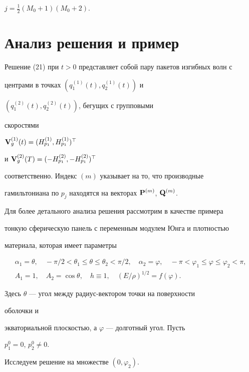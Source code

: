 $j=\frac{1}{2}(M_0+1)(M_0+2)$. 


 


\section{Анализ решения и пример} 


 


Решение (21) при $t>0$ представляет собой пару пакетов изгибных волн с 


центрами в точках $(q^{(1)}_1(t),q^{(1)}_2(t))$ и 


$(q^{(2)}_1(t),q^{(2)}_2(t))$, бегущих с групповыми 


скоростями 


$\bold V^{(1)}_g(t)=(H^{(1)}_{p_1},H^{(1)}_{p_1})^\top$ 


и $\bold V^{(2)}_g(T)=(-H^{(2)}_{p_1},-H^{(2)}_{p_1})^\top$ 


соответственно. Индекс $(m)$ указывает на то, что производные 


гамильтониана по $p_j$ находятся на векторах $\bold P^{(m)}$, $\bold Q^{(m)}$. 


 


Для более детального анализа решения рассмотрим в качестве примера 


тонкую сферическую панель с переменным модулем Юнга и плотностью 


материала, которая имеет параметры


\begin{gather*} 


\alpha_1=\theta,\quad -\pi/2<\theta_1\le\theta\le\theta_2<\pi/2,\quad 


\alpha_2=\varphi,\quad -\pi<\varphi_1\le\varphi\le\varphi_2<\pi,\\ 


A_1=1,\quad A_2=\cos\theta,\quad h\equiv 1,\quad 


(E/\rho)^{1/2}=f(\varphi). 


\end{gather*} 


Здесь $\theta$ --- угол между радиус-вектором точки на поверхности 


оболочки и 


экваториальной плоскостью, а $\varphi$ --- долготный угол. Пусть 


$p^0_1=0$, $p^0_2\ne 0$. 


Исследуем решение на множестве $(0,\varphi_2)$. 


